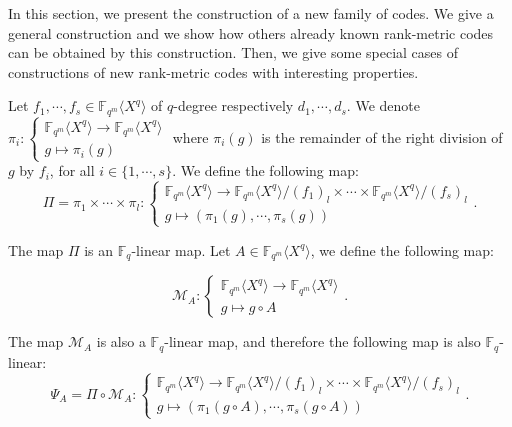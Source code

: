 \documentclass{article}
\theoremstyle{definition}
\begin{document}
In this section, we present the construction of a new family of codes. We
give a general construction and we show how others already known rank-metric
codes can be obtained by this construction. Then, we give some special cases of constructions of new rank-metric codes with interesting properties.

Let $f_1, \cdots, f_s \in \mathbb{F}_{q^m} \langle X^q \rangle$ of $q$-degree respectively $d_1, \cdots, d_s$. We denote $\pi_i : \left\{\begin{array}{l}
            \mathbb{F}_{q^m} \langle X^q \rangle \longrightarrow \mathbb{F}_{q^m}
            \langle X^q \rangle \\
            g \longmapsto \pi_i (g)
      \end{array}\right.$ where $\pi_i (g)$ is the remainder of the right division
of $g$ by $f_i$, for all $i \in \{ 1, \cdots, s \}$. We define the following
map:
\[ \Pi = \pi_1 \times \cdots \times \pi_l : \left\{\begin{array}{l}
            \mathbb{F}_{q^m} \langle X^q \rangle \longrightarrow \mathbb{F}_{q^m}
            \langle X^q \rangle / (f_1)_l \times \cdots \times \mathbb{F}_{q^m}
            \langle X^q \rangle / (f_s)_l \\
            g \longmapsto (\pi_1 (g), \cdots, \pi_s (g))
      \end{array}\right. . \]

The map $\Pi$ is an $\mathbb{F}_q$-linear map. Let $A \in \mathbb{F}_{q^m}
      \langle X^q \rangle$, we define the following map:

\[ \mathcal{M}_A : \left\{\begin{array}{l}
            \mathbb{F}_{q^m} \langle X^q \rangle \longrightarrow \mathbb{F}_{q^m}
            \langle X^q \rangle \\
            g \longmapsto g \circ A
      \end{array}\right. . \]

The map $\mathcal{M}_A$ is also a $\mathbb{F}_q$-linear map, and therefore the
following map is also $\mathbb{F}_q$-linear:
\begin{equation}
      \label{map} \Psi_A = \Pi \circ \mathcal{M}_A : \left\{\begin{array}{l}
            \mathbb{F}_{q^m} \langle X^q \rangle \longrightarrow \mathbb{F}_{q^m}
            \langle X^q \rangle / (f_1)_l \times \cdots \times \mathbb{F}_{q^m}
            \langle X^q \rangle / (f_s)_l \\
            g \longmapsto (\pi_1 (g \circ A), \cdots, \pi_s (g \circ A))
      \end{array}\right. .
\end{equation}
\end{document}

